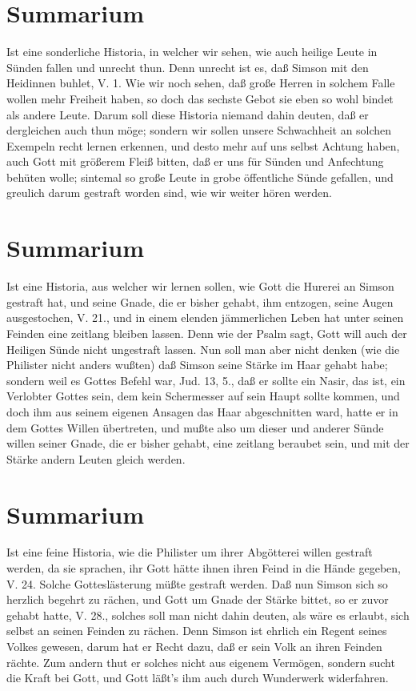 \section{Summarium}

Ist eine sonderliche Historia, in welcher wir sehen, wie auch heilige Leute in Sünden fallen und unrecht thun. Denn unrecht ist es, daß Simson mit den Heidinnen buhlet, V. 1. Wie wir noch sehen, daß große Herren in solchem Falle wollen mehr Freiheit haben, so doch das sechste Gebot sie eben so wohl bindet als andere Leute. Darum soll diese Historia niemand dahin deuten, daß er dergleichen auch thun möge; sondern wir sollen unsere Schwachheit an solchen Exempeln recht lernen erkennen, und desto mehr auf uns selbst Achtung haben, auch Gott mit größerem Fleiß bitten, daß er uns für Sünden und Anfechtung behüten wolle; sintemal so große Leute in grobe öffentliche Sünde gefallen, und greulich darum gestraft worden sind, wie wir weiter hören werden.

\section{Summarium}

Ist eine Historia, aus welcher wir lernen sollen, wie Gott die Hurerei an Simson gestraft hat, und seine Gnade, die er bisher gehabt, ihm entzogen, seine Augen ausgestochen, V. 21., und in einem elenden jämmerlichen Leben hat unter seinen Feinden eine zeitlang bleiben lassen. Denn wie der Psalm sagt, Gott will auch der Heiligen Sünde nicht ungestraft lassen. Nun soll man aber nicht denken (wie die Philister nicht anders wußten) daß Simson seine Stärke im Haar gehabt habe; sondern weil es Gottes Befehl war, Jud. 13, 5., daß er sollte ein Nasir, das ist, ein Verlobter Gottes sein, dem kein Schermesser auf sein Haupt sollte kommen, und doch ihm aus seinem eigenen Ansagen das Haar abgeschnitten ward, hatte er in dem Gottes Willen übertreten, und mußte also um dieser und anderer Sünde willen seiner Gnade, die er bisher gehabt, eine zeitlang beraubet sein, und mit der Stärke andern Leuten gleich werden.
\section{Summarium}

Ist eine feine Historia, wie die Philister um ihrer Abgötterei willen gestraft werden, da sie sprachen, ihr Gott hätte ihnen ihren Feind in die Hände gegeben, V. 24. Solche Gotteslästerung müßte gestraft werden. Daß nun Simson sich so herzlich begehrt zu rächen, und Gott um Gnade der Stärke bittet, so er zuvor gehabt hatte, V. 28., solches soll man nicht dahin deuten, als wäre es erlaubt, sich selbst an seinen Feinden zu rächen. Denn Simson ist ehrlich ein Regent seines Volkes gewesen, darum hat er Recht dazu, daß er sein Volk an ihren Feinden rächte. Zum andern thut er solches nicht aus eigenem Vermögen, sondern sucht die Kraft bei Gott, und Gott läßt’s ihm auch durch Wunderwerk widerfahren.

